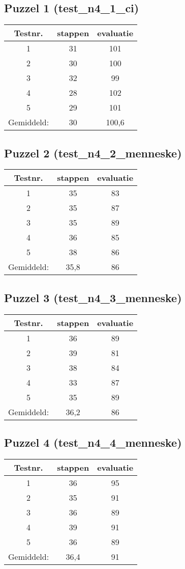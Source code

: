 \documentclass[]{report}
\begin{document}
\begin{appendices}
\subsection{Puzzel 1 (test\_n4\_1\_ci)}
\begin{tabular}{|c||c|c|}
\hline Testnr. & stappen & evaluatie \\ 
\hline \hline 1 & 31 & 101 \\ 
\hline 2 & 30 & 100 \\ 
\hline 3 & 32 & 99 \\ 
\hline 4 & 28 & 102 \\ 
\hline 5 & 29 & 101 \\ 
\hline \hline Gemiddeld: & 30 & 100,6 \\ 
\hline 
\end{tabular} 
\subsection{Puzzel 2 (test\_n4\_2\_menneske)}
\begin{tabular}{|c||c|c|}
\hline Testnr. & stappen & evaluatie \\ 
\hline \hline 1 & 35 & 83 \\ 
\hline 2 & 35 & 87 \\ 
\hline 3 & 35 & 89 \\ 
\hline 4 & 36 & 85 \\ 
\hline 5 & 38 & 86 \\ 
\hline \hline Gemiddeld: & 35,8 & 86 \\ 
\hline 
\end{tabular} 
\subsection{Puzzel 3 (test\_n4\_3\_menneske)}
\begin{tabular}{|c||c|c|}
\hline Testnr. & stappen & evaluatie \\ 
\hline \hline 1 & 36 & 89 \\ 
\hline 2 & 39 & 81 \\ 
\hline 3 & 38 & 84 \\ 
\hline 4 & 33 & 87 \\ 
\hline 5 & 35 & 89 \\ 
\hline \hline Gemiddeld: & 36,2 & 86 \\ 
\hline 
\end{tabular} 
\subsection{Puzzel 4 (test\_n4\_4\_menneske)}
\begin{tabular}{|c||c|c|}
\hline Testnr. & stappen & evaluatie \\ 
\hline \hline 1 & 36 & 95 \\ 
\hline 2 & 35 & 91 \\ 
\hline 3 & 36 & 89 \\ 
\hline 4 & 39 & 91 \\ 
\hline 5 & 36 & 89 \\ 
\hline \hline Gemiddeld: & 36,4 & 91 \\ 
\hline 
\end{tabular} 

\end{appendices}
\end{document}
